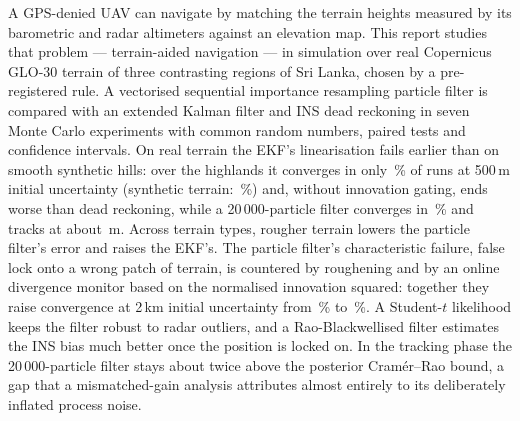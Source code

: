 A GPS-denied UAV can navigate by matching the terrain heights measured by its barometric and
radar altimeters against an elevation map. This report studies that problem --- terrain-aided
navigation --- in simulation over real Copernicus GLO-30 terrain of three contrasting regions of
Sri Lanka, chosen by a pre-registered rule. A vectorised sequential importance resampling
particle filter is compared with an extended Kalman filter and INS dead reckoning in seven
Monte Carlo experiments with common random numbers, paired tests and confidence intervals. On real
terrain the EKF's linearisation fails earlier than on smooth synthetic hills: over the highlands it
converges in only \EOneHillSFiveZeroZeroEkfConv\,\% of runs at 500\,m initial uncertainty (synthetic
terrain: \EOneSynthSFiveZeroZeroEkfConv\,\%) and, without innovation gating, ends worse than dead
reckoning, while a 20\,000-particle filter converges in
\EOneHillSFiveZeroZeroPfTwoZeroZeroZeroZeroConv\,\% and tracks at about
\EOneHillSFiveZeroZeroPfTwoZeroZeroZeroZeroTrack\,m. Across terrain types, rougher terrain lowers the
particle filter's error and raises the EKF's. The particle filter's characteristic failure, false
lock onto a wrong patch of terrain, is countered by roughening and by an online divergence monitor
based on the normalised innovation squared: together they raise convergence at 2\,km initial
uncertainty from \ESixHillSTwoZeroZeroZeroPfFiveZeroZeroZeroConv\,\% to
\ESixHillSTwoZeroZeroZeroPfMonitorRoughConv\,\%. A Student-$t$ likelihood keeps the filter robust to
radar outliers, and a Rao-Blackwellised filter estimates the INS bias much better once the position
is locked on. In the tracking phase the 20\,000-particle filter stays about twice above the
posterior Cramér--Rao bound, a gap that a mismatched-gain analysis attributes almost entirely to its
deliberately inflated process noise.
